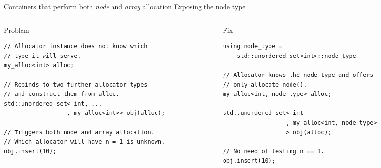 \documentclass[10pt,aspectratio=169]{beamer}
\begin{document}
\begin{frame}[fragile]
{Containers that perform both {\it node} and {\it array} allocation}
{Exposing the node type}

\begin{columns}
\begin{column}[t]{0.47\textwidth}
\begin{block}{Problem}
\end{block}
\begin{lstlisting}
// Allocator instance does not know which
// type it will serve.
my_alloc<int> alloc;

// Rebinds to two further allocator types
// and construct them from alloc.
std::unordered_set< int, ...
                  , my_alloc<int>> obj(alloc);

// Triggers both node and array allocation.
// Which allocator will have n = 1 is unknown.
obj.insert(10);
\end{lstlisting}
\end{column}
\begin{column}[t]{0.47\textwidth}
\begin{block}{Fix}
\end{block}
\begin{lstlisting}
using node_type =
    std::unordered_set<int>::node_type

// Allocator knows the node type and offers
// only allocate_node().
my_alloc<int, node_type> alloc;

std::unordered_set< int
                  , my_alloc<int, node_type>
                  > obj(alloc);

// No need of testing n == 1. 
obj.insert(10);
\end{lstlisting}
\end{column}
\end{columns}

\end{frame}
\end{document}
